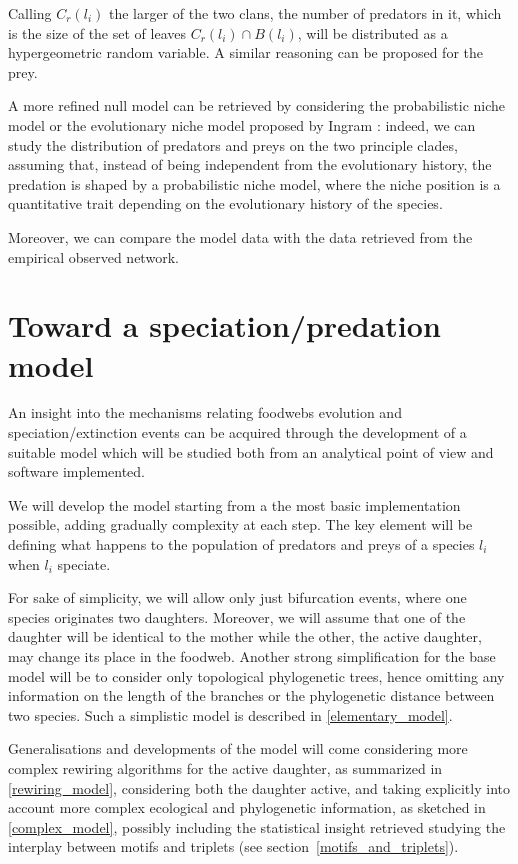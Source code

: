 \documentclass[12pt,a4paper]{report}
\begin{document}
Calling $C_r(l_i)$ the larger of the two clans, the number of predators in it, which is the size of the set of leaves $C_r(l_i) \cap B(l_i)$,  will be distributed as a hypergeometric random variable. A similar reasoning can be proposed for the prey.

A more refined null model can be retrieved by considering the probabilistic niche model \cite{williams2010probabilistic} or the evolutionary niche model proposed by Ingram \cite{ingram2012should}: indeed, we can study the distribution of predators and preys on the two principle clades, assuming that, instead of being independent from the evolutionary history, the predation is shaped by a probabilistic niche model, where the niche position is a quantitative trait depending on the evolutionary history of the species.

Moreover, we can compare the model data with the data retrieved from the empirical observed network.


\section{Toward a speciation/predation model}

An insight into the mechanisms relating foodwebs evolution and speciation/extinction events can be acquired through the development of a suitable model which will be studied both from an analytical point of view and software  implemented.

We will develop the model starting from a the most basic implementation possible, adding gradually complexity at each step. The key element will be defining what happens to the population of predators and preys of a species $l_i$ when $l_i$ speciate.

For sake of simplicity, we will allow only just bifurcation events, where one species originates two daughters. Moreover, we will assume that one of the daughter will be identical to the mother while the other, the active daughter, may change its place in the foodweb. Another strong simplification for the base model will be to consider only topological phylogenetic trees, hence omitting any information on the length of the branches or the phylogenetic distance between two species. Such a simplistic model is described in \ref{elementary_model}.

Generalisations and developments of the model will come considering more complex rewiring algorithms for the active daughter, as summarized in \ref{rewiring_model}, considering both the daughter active, and taking explicitly into account more complex ecological and phylogenetic information, as sketched in \ref{complex_model}, possibly including the statistical insight retrieved studying the interplay between motifs and triplets (see section~\ref{motifs_and_triplets}).
\end{document}
